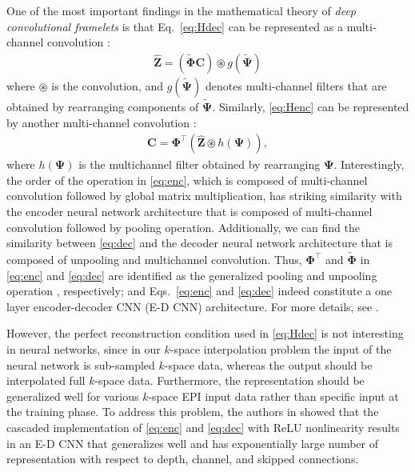\documentclass[num-refs]{wiley-article}
\newcommand{\Cb}{{\mathbf{C}}}
\newcommand{\Zb}{{\mathbf Z}}
\newcommand{\Phib}{{\boldsymbol {\Phi}}}
\newcommand{\Psib}{{\boldsymbol {\Psi}}}
\newcommand{\0}{{\boldsymbol{0}}}
\newcommand{\1}{\blmath{1}}
\begin{document}
	
	One of the most important findings in  the mathematical theory of {\em deep convolutional framelets} \cite{ye2018deep} is that
	Eq.~\eqref{eq:Hdec} can be represented  as a multi-channel convolution \cite{ye2018deep}:
	\begin{eqnarray}\label{eq:dec}
	\widehat\Zb= \left(\widetilde\Phib\Cb \right) \circledast g(\widetilde\Psib)
	\end{eqnarray}
	where $\circledast$ is the convolution, and $g(\widetilde\Psib)$ denotes multi-channel filters that are obtained by rearranging components of $\widetilde\Psib$.
	Similarly,  \eqref{eq:Henc} can be represented by another multi-channel convolution   \cite{ye2018deep}:
	\begin{eqnarray}\label{eq:enc}
	\Cb = \Phib^\top \left( \widehat \Zb \circledast h(\Psib) \right),
	\end{eqnarray}
	where $ h(\Psib)$ is the multichannel filter obtained by rearranging $\Psib$. 
	Interestingly, the order of the operation in \eqref{eq:enc}, which is composed of multi-channel convolution followed by global matrix multiplication, has striking similarity with the encoder neural network architecture that is composed of multi-channel convolution followed by pooling operation.
	Additionally,  we can find the similarity between \eqref{eq:dec} and the decoder neural network architecture that is composed of unpooling and multichannel convolution.
	Thus, $\Phib^\top$ and $\tilde\Phib$ in \eqref{eq:enc} and \eqref{eq:dec} are identified as the generalized pooling and unpooling operation \cite{ye2018deep}, respectively; and Eqs.~\eqref{eq:enc} and \eqref{eq:dec} indeed constitute a one layer encoder-decoder CNN (E-D CNN) architecture.  For more details, see \cite{ye2018deep}.
	
	
	However, the perfect reconstruction condition used in \eqref{eq:Hdec} is not interesting in neural networks, since in our $k$-space interpolation problem the input of the neural network is sub-sampled $k$-space data, whereas the output should be interpolated full $k$-space data. Furthermore, the representation should be generalized well for various $k$-space EPI input data rather than specific input at the training phase. To address this problem, the authors in \cite{ye2019understanding} showed that the cascaded implementation of \eqref{eq:enc} and \eqref{eq:dec} 
	with ReLU nonlinearity results in an E-D CNN that generalizes well and has exponentially large number of representation with respect to depth, channel, and skipped connections.
	
\end{document}
